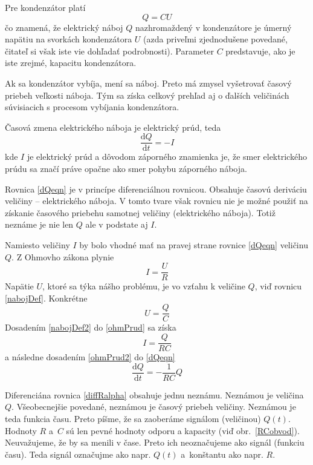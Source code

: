 \documentclass[a4paper, 10pt, ]{article}
\begin{document}
Pre kondenzátor platí
\begin{equation} \label{nabojDef}
    Q = CU
\end{equation}
čo znamená, že elektrický náboj $Q$ nazhromaždený v kondenzátore je úmerný napätiu na svorkách kondenzátora $U$ (azda priveľmi zjednodušene povedané, čitateľ si však iste vie dohľadať podrobnosti). Parameter $C$ predstavuje, ako je iste zrejmé, kapacitu kondenzátora.

Ak sa kondenzátor vybíja, mení sa náboj. Preto má zmysel vyšetrovať časový priebeh veľkosti náboja. Tým sa získa celkový prehľad aj o ďalších veličinách súvisiacich s procesom vybíjania kondenzátora.

Časová zmena elektrického náboja je elektrický prúd, teda
\begin{equation} \label{dQeqn}
    \frac{\text{d}Q}{\text{d}t} = - I
\end{equation}
kde $I$ je elektrický prúd a dôvodom záporného znamienka je, že smer elektrického prúdu sa značí práve opačne ako smer pohybu záporného náboja.


Rovnica \eqref{dQeqn} je v princípe diferenciálnou rovnicou. Obsahuje časovú deriváciu veličiny -- elektrického náboja. V tomto tvare však rovnicu nie je možné použiť na získanie časového priebehu samotnej veličiny (elektrického náboja). Totiž neznáme je nie len $Q$ ale v podstate aj $I$.


\bigskip

Namiesto veličiny $I$ by bolo vhodné mať na pravej strane rovnice \eqref{dQeqn} veličinu $Q$.
Z Ohmovho zákona plynie
\begin{equation} \label{ohmPrud}
    I = \frac{U}{R}
\end{equation}
Napätie $U$, ktoré sa týka nášho problému, je vo vzťahu k veličine $Q$, viď rovnicu  \eqref{nabojDef}. Konkrétne
\begin{equation} \label{nabojDef2}
    U = \frac{Q}{C}
\end{equation}
Dosadením \eqref{nabojDef2} do \eqref{ohmPrud} sa získa
\begin{equation} \label{ohmPrud2}
    I = \frac{Q}{RC}
\end{equation}
a následne dosadením \eqref{ohmPrud2} do \eqref{dQeqn}
\begin{equation} \label{diffRalpha}
    \frac{\text{d}Q}{\text{d}t} = - \frac{1}{RC} Q
\end{equation}

Diferenciána rovnica \eqref{diffRalpha} obsahuje jednu neznámu. Neznámou je veličina $Q$. Všeobecnejšie povedané, neznámou je časový priebeh veličiny. Neznámou je teda funkcia času. Preto píšme, že sa zaoberáme signálom (veličinou) $Q(t)$. Hodnoty $R$ a~$C$ sú len pevné hodnoty odporu a kapacity (viď obr.~\ref{RCobvod}). Neuvažujeme, že by sa menili v čase. Preto ich neoznačujeme ako signál (funkciu času). Teda signál označujme ako napr. $Q(t)$ a~konštantu ako napr. $R$.
\end{document}
